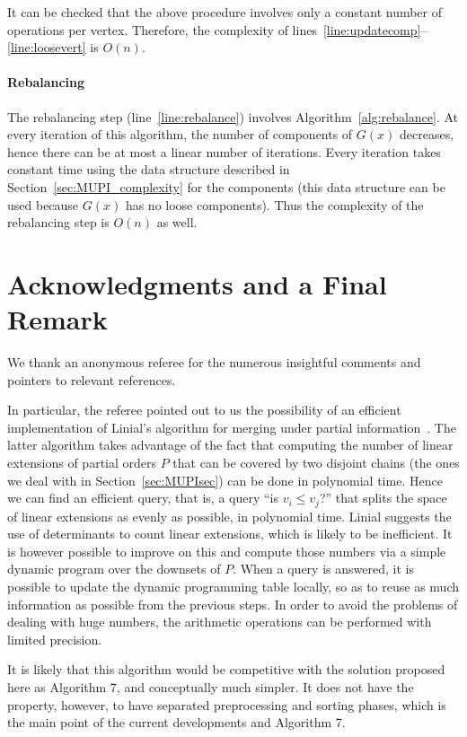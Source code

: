 \documentclass{article} \usepackage{fullpage}
\begin{document}
It can be checked that the above procedure involves only a constant number of operations per vertex. Therefore, the complexity of lines~\ref{line:updatecomp}--\ref{line:loosevert} is $O(n)$.

\paragraph*{Rebalancing}
The rebalancing step (line~\ref{line:rebalance}) involves Algorithm~\ref{alg:rebalance}. At every iteration of this algorithm, the number of components of $G(x)$ decreases, hence there can be at most a linear number of iterations. Every iteration takes constant time using the data structure described in Section~\ref{sec:MUPI_complexity} for the components (this data structure can be used because $G(x)$ has no loose components). Thus the complexity of the rebalancing step is $O(n)$ as well.

\section*{Acknowledgments and a Final Remark}

We thank an anonymous referee for the numerous insightful comments and pointers to relevant references. 

In particular, the referee pointed out to us the possibility of an efficient implementation of Linial's algorithm for merging under partial information~\cite{L84}. The latter algorithm takes advantage of the fact that computing the number of linear extensions of partial orders $P$ that can be covered by two disjoint chains (the ones we deal with in Section~\ref{sec:MUPIsec}) can be done in polynomial time. Hence we can find an efficient query, that is, a query ``is $v_i\leq v_j$?'' that splits the space of linear extensions as evenly as possible, in polynomial time. Linial suggests the use of determinants to count linear extensions, which is likely to be inefficient. It is however possible to improve on this and compute those numbers via a simple dynamic program over the downsets of $P$. When a query is answered, it is possible to update the dynamic programming table locally, so as to reuse as much information as possible from the previous steps. In order to avoid the problems of dealing with huge numbers, the arithmetic operations can be performed with limited precision. 

It is likely that this algorithm would be competitive with the solution proposed here as Algorithm 7, and conceptually much simpler. It does not have the property, however, to have separated preprocessing and sorting phases, which is the main point of the current developments and Algorithm 7.
\end{document}
